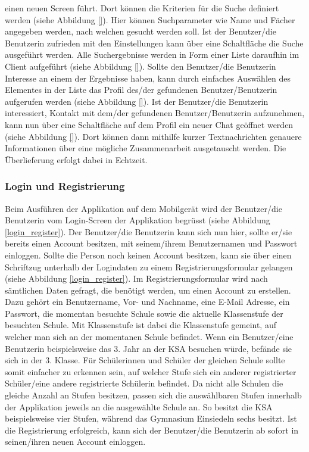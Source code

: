 \documentclass[../main.tex]{subfiles}
\begin{document}
einen neuen Screen führt. Dort können die Kriterien für die Suche definiert werden (siehe Abbildung \ref{}). Hier können Suchparameter wie Name und Fächer angegeben werden, nach welchen gesucht werden soll. Ist der Benutzer/die Benutzerin zufrieden mit den Einstellungen kann über eine Schaltfläche die Suche ausgeführt werden. Alle Suchergebnisse werden in Form einer Liste daraufhin im Client aufgeführt (siehe Abbildung \ref{}). Sollte den Benutzer/die Benutzerin Interesse an einem der Ergebnisse haben, kann durch einfaches Auswählen des Elementes in der Liste das Profil des/der gefundenen Benutzer/Benutzerin aufgerufen werden (siehe Abbildung \ref{}). Ist der Benutzer/die Benutzerin interessiert, Kontakt mit dem/der gefundenen Benutzer/Benutzerin aufzunehmen, kann nun über eine Schaltfläche auf dem Profil ein neuer Chat geöffnet werden (siehe Abbildung \ref{}). Dort können dann mithilfe kurzer Textnachrichten genauere Informationen über eine mögliche Zusammenarbeit ausgetauscht werden. Die Überlieferung erfolgt dabei in Echtzeit.


\subsubsection*{Login und Registrierung}
Beim Ausführen der Applikation auf dem Mobilgerät wird der Benutzer/die Benutzerin vom Login-Screen der Applikation begrüsst (siehe Abbildung \ref{login_register}). Der Benutzer/die Benutzerin kann sich nun hier, sollte er/sie bereits einen Account besitzen, mit seinem/ihrem Benutzernamen und Passwort einloggen. Sollte die Person noch keinen Account besitzen, kann sie über einen Schriftzug unterhalb der Logindaten zu einem Registrierungsformular gelangen (siehe Abbildung \ref{login_register}). Im Registrierungsformular wird nach sämtlichen Daten gefragt, die benötigt werden, um einen Account zu erstellen. Dazu gehört ein Benutzername, Vor- und Nachname, eine E-Mail Adresse, ein Passwort, die momentan besuchte Schule sowie die aktuelle Klassenstufe der besuchten Schule. Mit Klassenstufe ist dabei die Klassenstufe gemeint, auf welcher man sich an der momentanen Schule befindet. Wenn ein Benutzer/eine Benutzerin beispielsweise das 3. Jahr an der KSA besuchen würde, befände sie sich in der 3. Klasse. Für Schülerinnen und Schüler der gleichen Schule sollte somit einfacher zu erkennen sein, auf welcher Stufe sich ein anderer registrierter Schüler/eine andere registrierte Schülerin befindet. Da nicht alle Schulen die gleiche Anzahl an Stufen besitzen, passen sich die auswählbaren Stufen innerhalb der Applikation jeweils an die ausgewählte Schule an. So besitzt die KSA beispielsweise vier Stufen, während das Gymnasium Einsiedeln sechs besitzt. Ist die Registrierung erfolgreich, kann sich der Benutzer/die Benutzerin ab sofort in seinen/ihren neuen Account einloggen.
\end{document}
